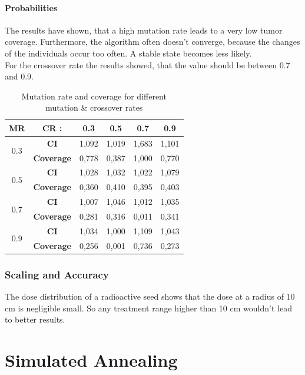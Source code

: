 \documentclass[12pt]{article}
\begin{document}
\newpage
\paragraph{Probabilities} 
The results have shown, that a high mutation rate leads to a very low tumor coverage. Furthermore, the algorithm often doesn't converge, because the changes of the individuals occur too often. A stable state becomes less likely. \\ For the crossover rate the results showed, that the value should be between 0.7 and 0.9.
\begin{table}[h]
\label{table:probabilities}
\begin{tabular}{c|ccccc}
\textbf{MR}          & \textbf{CR :}     & 0.3   & 0.5   & 0.7   & 0.9   \\ \hline
\multirow{2}{*}{0.3} & \textbf{CI}       & 1,092 & 1,019 & 1,683 & 1,101 \\
                     & \textbf{Coverage} & 0,778 & 0,387 & 1,000 & 0,770 \\ \hline
\multirow{2}{*}{0.5} & \textbf{CI}       & 1,028 & 1,032 & 1,022 & 1,079 \\
                     & \textbf{Coverage} & 0,360 & 0,410 & 0,395 & 0,403 \\ \hline
\multirow{2}{*}{0.7} & \textbf{CI}       & 1,007 & 1,046 & 1,012 & 1,035 \\
                     & \textbf{Coverage} & 0,281 & 0,316 & 0,011 & 0,341 \\ \hline
\multirow{2}{*}{0.9} & \textbf{CI}       & 1,034 & 1,000 & 1,109 & 1,043 \\
                     & \textbf{Coverage} & 0,256 & 0,001 & 0,736 & 0,273 \\
\end{tabular}
\caption{Mutation rate and coverage for different mutation \& crossover rates}

\end{table}
\subsubsection{Scaling and Accuracy}
The dose distribution of a radioactive seed shows that the dose at a radius of 10 cm is negligible small. So any treatment range higher than 10 cm wouldn't lead to better results. 
\section{Simulated Annealing}
\label{sec:SAIntro}
\end{document}
